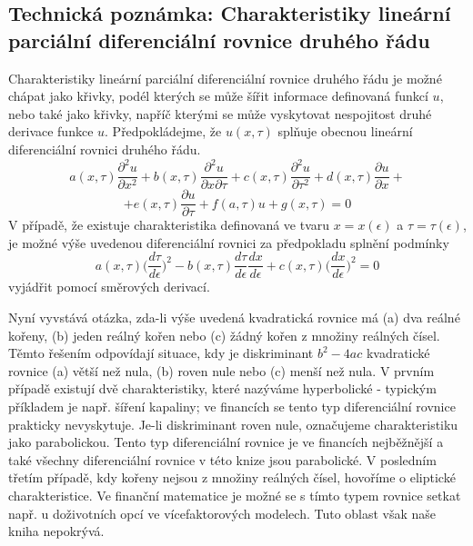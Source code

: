 \documentclass[a4paper]{book}
\begin{document}
\subsection{Technická poznámka: Charakteristiky lineární parciální diferenciální rovnice druhého řádu}

Charakteristiky lineární parciální diferenciální rovnice druhého řádu je možné chápat jako křivky, podél kterých se může šířit informace definovaná funkcí $u$, nebo také jako křivky, napříč kterými se může vyskytovat nespojitost druhé derivace funkce $u$. Předpokládejme, že $u(x, \tau)$ splňuje obecnou lineární diferenciální rovnici druhého řádu.
\begin{equation*}
a(x, \tau)\frac{\partial^2 u}{\partial x^2} + b(x, \tau)\frac{\partial^2 u}{\partial x \partial \tau} + c(x,\tau)\frac{\partial^2 u}{\partial \tau^2} + d(x, \tau)\frac{\partial u}{\partial x} + 
\end{equation*}
\begin{equation*}
+ e(x, \tau)\frac{\partial u}{\partial \tau} + f(a, \tau)u + g(x, \tau) = 0
\end{equation*}
V případě, že existuje charakteristika definovaná ve tvaru $x = x(\epsilon)$ a $\tau = \tau(\epsilon)$, je možné výše uvedenou diferenciální rovnici za předpokladu splnění podmínky
\begin{equation*}
a(x, \tau) \bigg( \frac{d \tau}{d \epsilon} \bigg)^2 - b(x, \tau)\frac{d \tau}{d \epsilon} \frac{d x}{d \epsilon} + c(x, \tau) \bigg( \frac{dx}{d \epsilon} \bigg)^2 = 0
\end{equation*}
 vyjádřit pomocí směrových derivací.

Nyní vyvstává otázka, zda-li výše uvedená kvadratická rovnice má (a) dva reálné kořeny, (b) jeden reálný kořen nebo (c) žádný kořen z množiny reálných čísel. Těmto řešením odpovídají situace, kdy je diskriminant $b^2 - 4ac$ kvadratické rovnice (a) větší než nula, (b) roven nule nebo (c) menší než nula. V prvním případě existují dvě charakteristiky, které nazýváme hyperbolické - typickým příkladem je např. šíření kapaliny; ve financích se tento typ diferenciální rovnice prakticky nevyskytuje. Je-li diskriminant roven nule, označujeme charakteristiku jako parabolickou. Tento typ diferenciální rovnice je ve financích nejběžnější a také všechny diferenciální rovnice v této knize jsou parabolické. V posledním třetím případě, kdy kořeny nejsou z množiny reálných čísel, hovoříme o eliptické charakteristice. Ve finanční matematice je možné se s tímto typem rovnice setkat např. u doživotních opcí ve vícefaktorových modelech. Tuto oblast však naše kniha nepokrývá.
\end{document}
